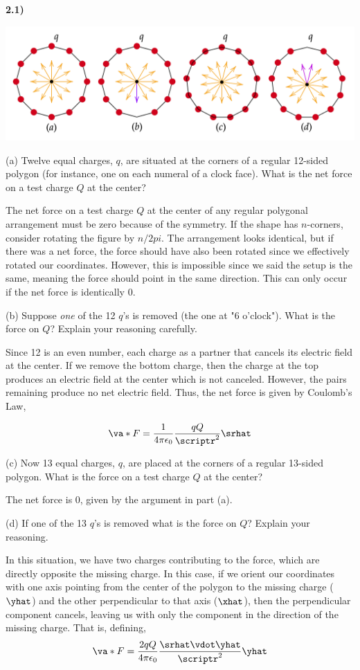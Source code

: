 \documentclass[12pt,a4paper]{article}
\newcommand{\prob}[2]{\textbf{#1)} #2}
\begin{document}
\prob{2.1}{}

\bef
\includegraphics[scale=0.3]{./fig1.png}
\eef

(a) Twelve equal charges, $q$, are situated at the corners of a regular 12-sided polygon (for instance, one on each numeral of a clock face). What is the net force on a test charge $Q$ at the center?

The net force on a test charge $Q$ at the center of any regular polygonal arrangement must be zero because of the symmetry. 
If the shape has $n$-corners, consider rotating the figure by $n/2pi$. The arrangement looks identical, but if there was a net force, the force should have also been rotated since we effectively rotated our coordinates.
However, this is impossible since we said the setup is the same, meaning the force should point in the same direction.
This can only occur if the net force is identically 0.

(b) Suppose \textit{one} of the 12 $q$'s is removed (the one at "6 o'clock"). What is the force on $Q$? Explain your reasoning carefully.

Since 12 is an even number, each charge as a partner that cancels its electric field at the center. 
If we remove the bottom charge, then the charge at the top produces an electric field at the center which is not canceled.
However, the pairs remaining produce no net electric field. 
Thus, the net force is given by Coulomb's Law,

\begin{align*}
\va*{F} = \frac{1}{4\pi\epsilon_0}\frac{qQ}{\scriptr^2}\srhat
\end{align*}

(c) Now 13 equal charges, $q$, are placed at the corners of a regular 13-sided polygon. What is the force on a test charge $Q$ at the center?

The net force is 0, given by the argument in part (a).

(d) If one of the 13 $q$'s is removed what is the force on $Q$? Explain your reasoning.

In this situation, we have two charges contributing to the force, which are directly opposite the missing charge. 
In this case, if we orient our coordinates with one axis pointing from the center of the polygon to the missing charge ($\yhat$) and the other perpendicular to that axis ($\xhat$), then the perpendicular component cancels, leaving us with only the component in the direction of the missing charge.
That is, defining,
\begin{align*}
\va*{F} = \frac{2qQ}{4\pi\epsilon_0}\frac{\srhat \vdot \yhat}{\scriptr^2} \yhat
\end{align*}
\end{document}
